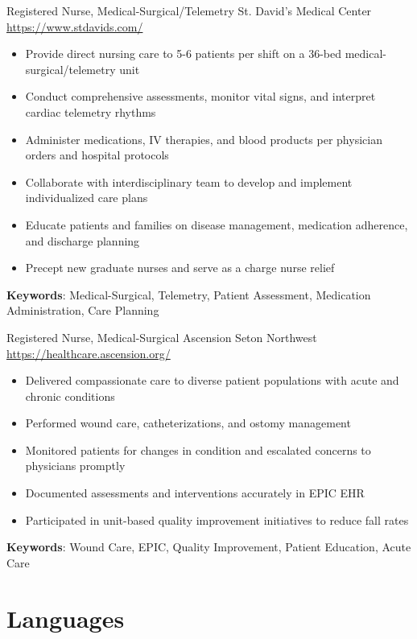 \documentclass[a4paper, serif, 10pt]{moderncv}
\begin{document}
        {Registered Nurse, Medical-Surgical/Telemetry}
        {St. David's Medical Center}
        {\url{https://www.stdavids.com/}}
        {}
        {\begin{itemize}
\item Provide direct nursing care to 5-6 patients per shift on a 36-bed medical-surgical/telemetry unit
\item Conduct comprehensive assessments, monitor vital signs, and interpret cardiac telemetry rhythms
\item Administer medications, IV therapies, and blood products per physician orders and hospital protocols
\item Collaborate with interdisciplinary team to develop and implement individualized care plans
\item Educate patients and families on disease management, medication adherence, and discharge planning
\item Precept new graduate nurses and serve as a charge nurse relief
\end{itemize}
\textbf{Keywords}: Medical-Surgical, Telemetry, Patient Assessment, Medication Administration, Care Planning}

        {Registered Nurse, Medical-Surgical}
        {Ascension Seton Northwest}
        {\url{https://healthcare.ascension.org/}}
        {}
        {\begin{itemize}
\item Delivered compassionate care to diverse patient populations with acute and chronic conditions
\item Performed wound care, catheterizations, and ostomy management
\item Monitored patients for changes in condition and escalated concerns to physicians promptly
\item Documented assessments and interventions accurately in EPIC EHR
\item Participated in unit-based quality improvement initiatives to reduce fall rates
\end{itemize}
\textbf{Keywords}: Wound Care, EPIC, Quality Improvement, Patient Education, Acute Care}
\section{Languages}

\end{document}

